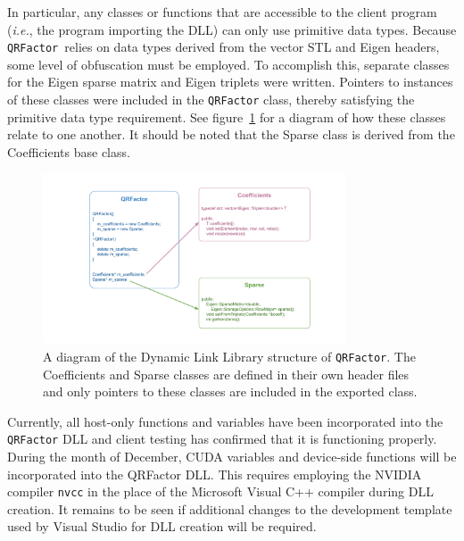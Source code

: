 \documentclass[11pt,letterpaper]{article}
\newcommand{\qrf}{\texttt{QRFactor}}
\begin{document}
In particular, any classes or functions that are accessible to the client program ({\it i.e.}, the program importing the DLL) can only use primitive data types. Because \qrf~relies on data types derived from the vector STL and Eigen headers, some level of obfuscation must be employed. To accomplish this, separate classes for the Eigen sparse matrix and Eigen triplets were written. Pointers to instances of these classes were included in the \qrf\! class, thereby satisfying the primitive data type requirement. See figure~\ref{fig: class diagram} for a diagram of how these classes relate to one another. It should be noted that the Sparse class is derived from the Coefficients base class.

\begin{figure}[h]
    \centering
    \includegraphics[width=0.8\textwidth]{QRFactorLib_Diagram.pdf}
    \caption{A diagram of the Dynamic Link Library structure of \qrf. The Coefficients and Sparse classes are defined in their own header files and only pointers to these classes are included in the exported class.}
    \label{fig: class diagram}
\end{figure}

Currently, all host-only functions and variables have been incorporated into the \qrf\! DLL and client testing has confirmed that it is functioning properly. During the month of December, CUDA variables and device-side functions will be incorporated into the QRFactor DLL. This requires employing the NVIDIA compiler \verb+nvcc+ in the place of the Microsoft Visual C++ compiler during DLL creation. It remains to be seen if additional changes to the development template used by Visual Studio for DLL creation will be required.

\appendix
\section*{}
\end{document}
